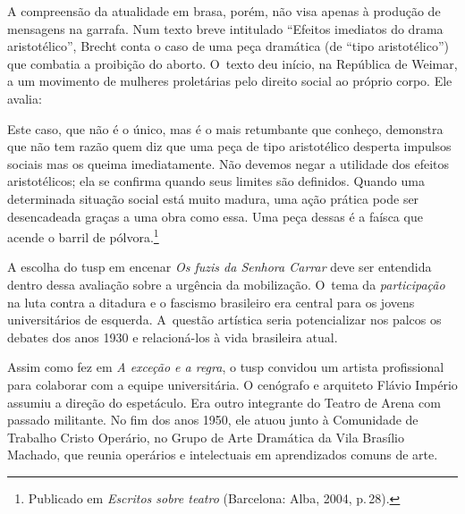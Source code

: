 A compreensão da atualidade em brasa, porém, não visa apenas à produção
de mensagens na garrafa. Num texto breve intitulado “Efeitos imediatos
do drama aristotélico”, Brecht conta o caso de uma peça dramática (de
“tipo aristotélico”) que combatia a proibição do aborto. O~texto deu
início, na República de Weimar, a um movimento de mulheres proletárias
pelo direito social ao próprio corpo. Ele avalia:

\startblockquote
Este caso, que não é o único, mas é o mais retumbante que conheço,
demonstra que não tem razão quem diz que uma peça de tipo aristotélico
desperta impulsos sociais mas os queima imediatamente. Não devemos negar
a utilidade dos efeitos aristotélicos; ela se confirma quando seus
limites são definidos. Quando uma determinada situação social está muito
madura, uma ação prática pode ser desencadeada graças a uma obra como
essa. Uma peça dessas é a faísca que acende o barril de
pólvora.\footnote{Publicado em {\it Escritos sobre teatro} (Barcelona:
  Alba, 2004, p.\,28).}
\stopblockquote


A escolha do {\sc tusp} em encenar {\it Os fuzis da Senhora Carrar} deve ser
entendida dentro dessa avaliação sobre a urgência da mobilização. O~tema
da {\it participação} na luta contra a ditadura e o fascismo brasileiro
era central para os jovens universitários de esquerda. A~questão
artística seria potencializar nos palcos os debates dos anos 1930 e
relacioná-los à vida brasileira atual.

\subject{Formação da equipe}

Assim como fez em {\it A exceção e a regra}, o {\sc tusp} convidou um
artista profissional para colaborar com a equipe universitária. O
cenógrafo e arquiteto Flávio Império assumiu a direção do espetáculo.
Era outro integrante do Teatro de Arena com passado militante. No fim
dos anos 1950, ele atuou junto à Comunidade de Trabalho Cristo Operário,
no Grupo de Arte Dramática da Vila Brasílio Machado, que reunia
operários e intelectuais em aprendizados comuns de arte.

